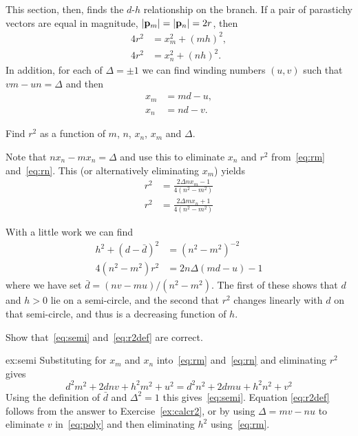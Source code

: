 This section, then, finds the $d$-$h$ relationship on the   branch.
If a pair of parastichy vectors are  equal in magnitude, $\left|{\mathbf p}_{m}\right|=\left|{\mathbf p}_{n}\right|=2r$, then 
\begin{align}
 	\label{eq:rm}
4 r^2&=x_m^2 + (mh)^2,\\
\label{eq:rn}
4 r^2&= x_n^2 + (nh)^2.
\end{align}
In addition, for each of $\Delta=\pm1$ we can find winding numbers $(u,v)$ such that $vm-un=\Delta$ 
and then
 \begin{align}
  x_m&=md-u,\\ 
  x_n&=nd-v. 
  \end{align}
\begin{jExercise}\label{ex:calcr2}
	Find $r^2$ as a function of $m$, $n$, $x_n$, $x_m$ and $\Delta$.
\end{jExercise}
\begin{jAnswer}
	Note that $n x_n - m x_n=\Delta$ and use this to eliminate $x_n$ and $r^2$ from~\eqref{eq:rm} and~\eqref{eq:rn}.
	This (or alternatively eliminating $x_m$) yields
	\begin{align}
	r^2		&= \frac{2 \Delta n x_m -1}{4(n^2-m^2)} \label{ex:r2xm}
		\\
		r^2		&=  \frac{2 \Delta m x_n + 1}{4(n^2-m^2)} \label{ex:r2xn}
	\end{align}

\end{jAnswer}
With a little work we can find
 \begin{align}
h^2  +  (d-\bar d)^2 
 &= (n^2-m^2)^{-2} \label{eq:semi}
\\
\label{eq:r2def}
4  (n^2-m^2) r^2 &= 2  n \Delta ( m d - u)-1
\end{align}
where we have set  $\bar d= {(nv-mu)}/{(n^2-m^2)}$. The first of these shows that $d$ and $h>0$ lie on a semi-circle, and the second that $r^2$ changes linearly with $d$ on that semi-circle, and thus is a decreasing function of $h$.
\begin{jExercise}\label{ex:semi}
	Show that~\eqref{eq:semi} and~\eqref{eq:r2def} are correct.
\end{jExercise} 
\begin{jAnswer}{ex:semi}
Substituting for $x_m$ and $x_n$ into~\eqref{eq:rm} and~\eqref{eq:rn} and eliminating $r^2$ gives
\begin{equation}
	\label{eq:poly}
d^2 m^2+2 d n v+h^2 m^2+u^2=d^2 n^2+2 d m u+h^2 n^2+v^2
\end{equation}
Using the definition of $\bar{d}$ and $\Delta^2=1$ this gives~\eqref{eq:semi}. 
Equation \eqref{eq:r2def} follows from the answer to Exercise~\ref{ex:calcr2}, or by 
 using $\Delta=mv-nu$ to eliminate $v$ in~\eqref{eq:poly} and then eliminating $h^2$ using~\eqref{eq:rm}.

\end{jAnswer}



